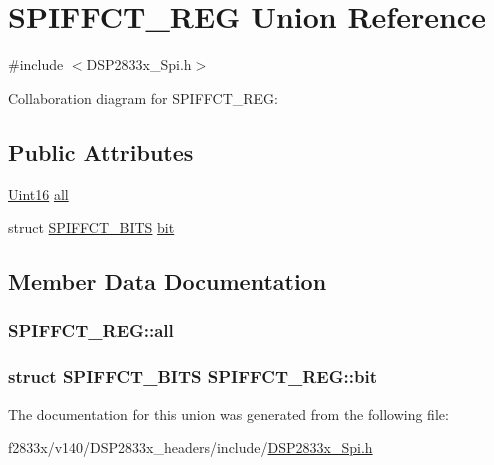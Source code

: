 \hypertarget{union_s_p_i_f_f_c_t___r_e_g}{}\section{S\+P\+I\+F\+F\+C\+T\+\_\+\+R\+E\+G Union Reference}
\label{union_s_p_i_f_f_c_t___r_e_g}


{\ttfamily \#include $<$D\+S\+P2833x\+\_\+\+Spi.\+h$>$}



Collaboration diagram for S\+P\+I\+F\+F\+C\+T\+\_\+\+R\+E\+G\+:
\subsection*{Public Attributes}
\begin{DoxyCompactItemize}
\item 
\hyperlink{_d_s_p2833x___device_8h_a59a9f6be4562c327cbfb4f7e8e18f08b}{Uint16} \hyperlink{union_s_p_i_f_f_c_t___r_e_g_aecd9a674e46e8e5abbef0cbaeb4f508f}{all}
\item 
struct \hyperlink{struct_s_p_i_f_f_c_t___b_i_t_s}{S\+P\+I\+F\+F\+C\+T\+\_\+\+B\+I\+T\+S} \hyperlink{union_s_p_i_f_f_c_t___r_e_g_a367c58db23e51769e6585b5695599bcb}{bit}
\end{DoxyCompactItemize}


\subsection{Member Data Documentation}
\hypertarget{union_s_p_i_f_f_c_t___r_e_g_aecd9a674e46e8e5abbef0cbaeb4f508f}{}
\subsubsection[{all}]{ S\+P\+I\+F\+F\+C\+T\+\_\+\+R\+E\+G\+::all}\label{union_s_p_i_f_f_c_t___r_e_g_aecd9a674e46e8e5abbef0cbaeb4f508f}
\hypertarget{union_s_p_i_f_f_c_t___r_e_g_a367c58db23e51769e6585b5695599bcb}{}
\subsubsection[{bit}]{\setlength{\rightskip}{0pt plus 5cm}struct {\bf S\+P\+I\+F\+F\+C\+T\+\_\+\+B\+I\+T\+S} S\+P\+I\+F\+F\+C\+T\+\_\+\+R\+E\+G\+::bit}\label{union_s_p_i_f_f_c_t___r_e_g_a367c58db23e51769e6585b5695599bcb}


The documentation for this union was generated from the following file\+:\begin{DoxyCompactItemize}
\item 
f2833x/v140/\+D\+S\+P2833x\+\_\+headers/include/\hyperlink{_d_s_p2833x___spi_8h}{D\+S\+P2833x\+\_\+\+Spi.\+h}\end{DoxyCompactItemize}
